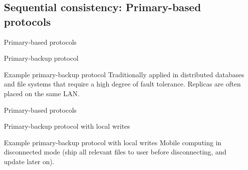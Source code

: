 \subsection{Sequential consistency: Primary-based protocols}
\begin{slide}{Primary-based protocols}
  \begin{block}{Primary-backup protocol}
    \begin{centerfig}
    \end{centerfig}
  \end{block}
  \begin{exampleblock}{Example primary-backup protocol}
    Traditionally applied in distributed databases and file systems that require a high degree of fault
    tolerance. Replicas are often placed on the same LAN.
  \end{exampleblock}
\end{slide}
\begin{slide}{Primary-based protocols}
  \begin{block}{Primary-backup protocol with local writes}
    \begin{centerfig}
    \end{centerfig}
  \end{block}
  \begin{exampleblock}{Example primary-backup protocol with local writes}
    Mobile computing in disconnected mode (ship all relevant files to user before disconnecting, and update
    later on).
  \end{exampleblock}
\end{slide}
